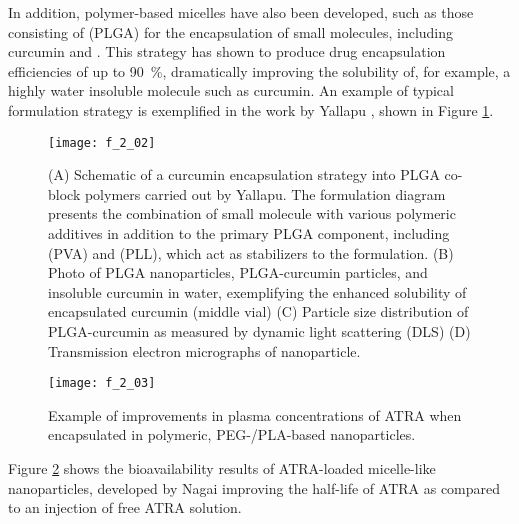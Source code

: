 \begin{refsection}
In addition, polymer-based micelles have also been developed, such as those
consisting of  (PLGA) for the
encapsulation of small molecules, including curcumin and
.\cite{Li2009,Yallapu2010b} This strategy has
shown to produce drug encapsulation efficiencies of up to \SI{90}{\percent},
dramatically improving the solubility of, for example, a highly water insoluble
molecule such as curcumin. An example of typical formulation strategy is
exemplified in the work by Yallapu , shown in Figure
\ref{fig:PLA_curcumin_example}.\cite{Yallapu2010b}
\begin{figure}[h!] \centering \texttt{[image: f\_2\_02]}
    \caption[(A) Schematic of a curcumin encapsulation strategy into PLGA co-block
    polymers carried out by Yallapu. The formulation diagram presents the
    combination of small molecule with various polymeric additives in addition
    to the primary PLGA component, including  (PVA) and
     (PLL), which act as stabilizers to the formulation.
    (B) Photo of PLGA nanoparticles, PLGA-curcumin particles, and insoluble
    curcumin in water, exemplifying the enhanced solubility of encapsulated
    curcumin (middle vial) (C) Particle size distribution of PLGA-curcumin as
    measured by dynamic light scattering (DLS) (D) Transmission electron
    micrographs of nanoparticle.
    ]{(A) Schematic of a curcumin encapsulation strategy into PLGA co-block
    polymers carried out by Yallapu. The formulation diagram presents the
    combination of small molecule with various polymeric additives in addition
    to the primary PLGA component, including  (PVA) and
     (PLL), which act as stabilizers to the formulation.
    (B) Photo of PLGA nanoparticles, PLGA-curcumin particles, and insoluble
    curcumin in water, exemplifying the enhanced solubility of encapsulated
    curcumin (middle vial) (C) Particle size distribution of PLGA-curcumin as
    measured by dynamic light scattering (DLS) (D) Transmission electron
    micrographs of nanoparticle.\cite{Yallapu2010b}}
    \label{fig:PLA_curcumin_example} \end{figure}
\begin{figure}[h!] \centering \texttt{[image: f\_2\_03]}
    \caption[Example of improvements in plasma concentrations of ATRA when
    encapsulated in polymeric, PEG-/PLA-based nanoparticles.]{Example of improvements in plasma concentrations of ATRA when
    encapsulated in polymeric, PEG-/PLA-based
    nanoparticles.\cite{Li2009}}\label{fig:PLA_ATRA_example} \end{figure}
Figure \ref{fig:PLA_ATRA_example} shows the bioavailability results of
ATRA-loaded micelle-like nanoparticles, developed by Nagai  improving the half-life of ATRA as compared to an injection of
free ATRA solution.\cite{Li2009}


\end{refsection}
